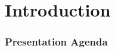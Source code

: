 \section{Introduction}
\begin{frame}
\frametitle{Presentation Agenda}
\tableofcontents[currentsection]
\end{frame}
